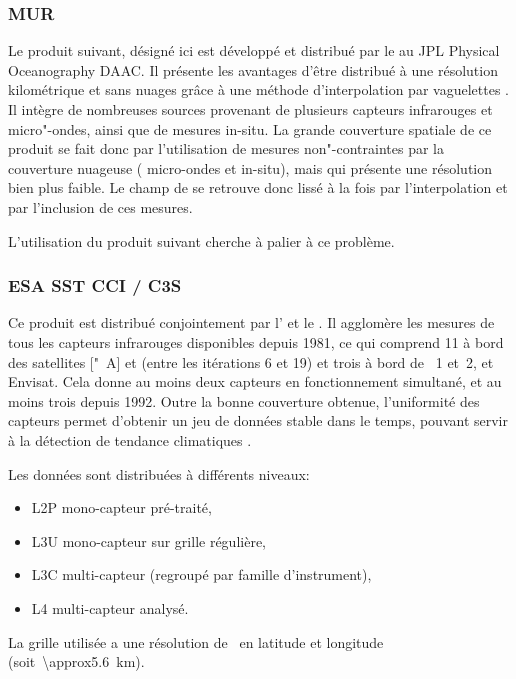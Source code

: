 \subsubsection{MUR}

Le produit suivant, désigné ici  est développé et distribué par le  au JPL Physical Oceanography DAAC.
Il présente les avantages d'être distribué à une résolution kilométrique et sans nuages grâce à une méthode d'interpolation par vaguelettes \parencite{chin_2017}.
Il intègre de nombreuses sources provenant de plusieurs capteurs infrarouges et micro"-ondes, ainsi que de mesures in-situ.
La grande couverture spatiale de ce produit se fait donc par l'utilisation de mesures non"-contraintes par la couverture nuageuse ( micro-ondes et in-situ), mais qui présente une résolution bien plus faible.
Le champ de  se retrouve donc lissé à la fois par l'interpolation et par l'inclusion de ces mesures.

L'utilisation du produit suivant cherche à palier à ce problème.

\subsubsection{ESA SST CCI / C3S}

Ce produit est distribué conjointement par l'   et le .
Il agglomère les mesures de tous les capteurs infrarouges disponibles depuis 1981, ce qui comprend 11  à bord des satellites ["~A] et  (entre les itérations 6 et 19) et trois  à bord de ~1 et~2, et Envisat.
Cela donne au moins deux capteurs en fonctionnement simultané, et au moins trois depuis 1992.
Outre la bonne couverture obtenue, l'uniformité des capteurs permet d'obtenir un jeu de données stable dans le temps, pouvant servir à la détection de tendance climatiques \parencite{merchant_2019}.

Les données sont distribuées à différents niveaux:
\begin{itemize}
  \item L2P mono-capteur pré-traité,
  \item L3U mono-capteur sur grille régulière,
  \item L3C multi-capteur (regroupé par famille d'instrument),
  \item L4 multi-capteur analysé.
\end{itemize}
La grille utilisée a une résolution de~ en latitude et longitude (soit~\qty{\approx5.6}{\km}).

